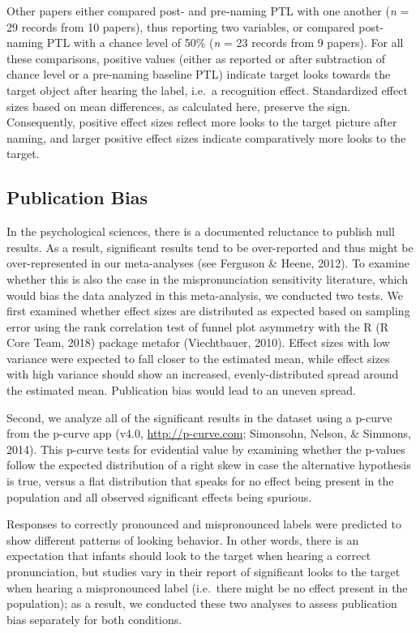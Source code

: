 \documentclass[man]{apa6}
\begin{document}
Other papers either compared post- and pre-naming PTL with one another (\emph{n} = 29 records from 10 papers), thus reporting two variables, or compared post-naming PTL with a chance level of 50\% (\emph{n} = 23 records from 9 papers). For all these comparisons, positive values (either as reported or after subtraction of chance level or a pre-naming baseline PTL) indicate target looks towards the target object after hearing the label, i.e.~a recognition effect. Standardized effect sizes based on mean differences, as calculated here, preserve the sign. Consequently, positive effect sizes reflect more looks to the target picture after naming, and larger positive effect sizes indicate comparatively more looks to the target.

\hypertarget{publication-bias}{%
\subsection{Publication Bias}\label{publication-bias}}

In the psychological sciences, there is a documented reluctance to publish null results. As a result, significant results tend to be over-reported and thus might be over-represented in our meta-analyses (see Ferguson \& Heene, 2012). To examine whether this is also the case in the mispronunciation sensitivity literature, which would bias the data analyzed in this meta-analysis, we conducted two tests. We first examined whether effect sizes are distributed as expected based on sampling error using the rank correlation test of funnel plot asymmetry with the R (R Core Team, 2018) package metafor (Viechtbauer, 2010). Effect sizes with low variance were expected to fall closer to the estimated mean, while effect sizes with high variance should show an increased, evenly-distributed spread around the estimated mean. Publication bias would lead to an uneven spread.

Second, we analyze all of the significant results in the dataset using a p-curve from the p-curve app (v4.0, \url{http://p-curve.com}; Simonsohn, Nelson, \& Simmons, 2014). This p-curve tests for evidential value by examining whether the p-values follow the expected distribution of a right skew in case the alternative hypothesis is true, versus a flat distribution that speaks for no effect being present in the population and all observed significant effects being spurious.

Responses to correctly pronounced and mispronounced labels were predicted to show different patterns of looking behavior. In other words, there is an expectation that infants should look to the target when hearing a correct pronunciation, but studies vary in their report of significant looks to the target when hearing a mispronounced label (i.e.~there might be no effect present in the population); as a result, we conducted these two analyses to assess publication bias separately for both conditions.
\end{document}
